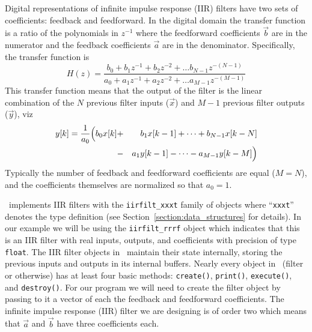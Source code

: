Digital representations of infinite impulse response (IIR) filters have
two sets of coefficients: feedback and feedforward.
In the digital domain the transfer function is a ratio of the
polynomials in $z^{-1}$ where the
feedforward coefficients $\vec{b}$ are in the numerator and the
feedback coefficients $\vec{a}$ are in the denominator.
Specifically, the transfer function is
%
\begin{equation}
    H(z) =
        \frac{
            b_0 + b_1 z^{-1} + b_2 z^{-2} + \ldots b_{N-1}z^{-(N-1)}
        }{
            a_0 + a_1 z^{-1} + a_2 z^{-2} + \ldots a_{M-1}z^{-(M-1)}
        }
\end{equation}
%
This transfer function means that the output of the filter is the linear
combination of the $N$ previous filter inputs ($\vec{x}$)
and $M-1$ previous filter outputs ($\vec{y}$), viz
%
\begin{eqnarray}
    y[k] =
        \frac{1}{a_0}
        \Bigl(
            b_0 x[k] &+& b_1 x[k-1] + \cdots + b_{N-1} x[k-N]\\
                     &-& a_1 y[k-1] - \cdots - a_{M-1} y[k-M]
        \Bigr)
\end{eqnarray}
%
Typically the number of feedback and feedforward coefficients are equal
($M=N$), and the coefficients themselves are normalized so that $a_0=1$.

\liquid\ implements IIR filters with the {\tt iirfilt\_xxxt} family of
objects where ``{\tt xxxt}'' denotes the type definition
(see Section~\ref{section:data_structures} for details).
In our example we will be using the {\tt iirfilt\_rrrf} object which
indicates that this is an IIR filter with real inputs, outputs, and
coefficients with precision of type {\tt float}.
The IIR filter objects in \liquid\ maintain their state
internally, storing the previous inputs and outputs in its internal
buffers.
Nearly every object in \liquid\ (filter or otherwise) has at least four
basic methods:
{\tt create()},
{\tt print()},
{\tt execute()}, and
{\tt destroy()}.
For our program we will need to create the filter object by passing to
it a vector of each the feedback and feedforward coefficients.
The infinite impulse response (IIR) filter we are designing is of order
two which means that $\vec{a}$ and $\vec{b}$ have three coefficients
each.

